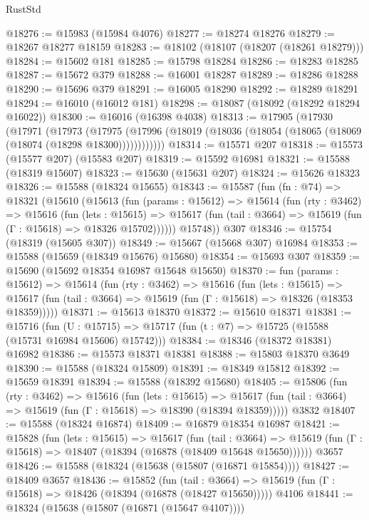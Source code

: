 \begin{lexlean}{RustStd}
\begin{coremodule}
@18276 := @15983 (@15984 @4076)
@18277 := @18274 @18276
@18279 := @18267 @18277 @18159
@18283 := @18102 (@18107 (@18207 (@18261 @18279)))
@18284 := @15602 @181
@18285 := @15798 @18284
@18286 := @18283 @18285
@18287 := @15672 @379
@18288 := @16001 @18287
@18289 := @18286 @18288
@18290 := @15696 @379
@18291 := @16005 @18290
@18292 := @18289 @18291
@18294 := @16010 (@16012 @181)
@18298 := @18087 (@18092 (@18292 @18294 @16022))
@18300 := @16016 (@16398 @4038)
@18313 := @17905
    (@17930
      (@17971
        (@17973
          (@17975 (@17996 (@18019 (@18036 (@18054 (@18065 (@18069 (@18074 (@18298 @18300))))))))))))
@18314 := @15571 @207
@18318 := @15573 (@15577 @207) (@15583 @207)
@18319 := @15592 @16981
@18321 := @15588 (@18319 @15607)
@18323 := @15630 (@15631 @207)
@18324 := @15626 @18323
@18326 := @15588 (@18324 @15655)
@18343 := @15587
    (fun (fn : @74) =>
    @18321
      (@15610
        (@15613
          (fun (params : @15612) =>
          @15614
            (fun (rty : @3462) =>
            @15616
              (fun (lets : @15615) =>
              @15617 (fun (tail : @3664) => @15619 (fun (Γ : @15618) => @18326 @15702))))))
        @15748))
    @307
@18346 := @15754 (@18319 (@15605 @307))
@18349 := @15667 (@15668 @307) @16984
@18353 := @15588 (@15659 (@18349 @15676) @15680)
@18354 := @15693 @307
@18359 := @15690 (@15692 @18354 @16987 @15648 @15650)
@18370 := fun (params : @15612) =>
  @15614
    (fun (rty : @3462) =>
    @15616
      (fun (lets : @15615) =>
      @15617 (fun (tail : @3664) => @15619 (fun (Γ : @15618) => @18326 (@18353 @18359)))))
@18371 := @15613 @18370
@18372 := @15610 @18371
@18381 := @15716
    (fun (U : @15715) => @15717 (fun (t : @7) => @15725 (@15588 (@15731 @16984 @15606) @15742)))
@18384 := @18346 (@18372 @18381) @16982
@18386 := @15573 @18371 @18381
@18388 := @15803 @18370 @3649
@18390 := @15588 (@18324 @15809)
@18391 := @18349 @15812
@18392 := @15659 @18391
@18394 := @15588 (@18392 @15680)
@18405 := @15806
    (fun (rty : @3462) =>
    @15616
      (fun (lets : @15615) =>
      @15617 (fun (tail : @3664) => @15619 (fun (Γ : @15618) => @18390 (@18394 @18359)))))
    @3832
@18407 := @15588 (@18324 @16874)
@18409 := @16879 @18354 @16987
@18421 := @15828
    (fun (lets : @15615) =>
    @15617
      (fun (tail : @3664) =>
      @15619 (fun (Γ : @15618) => @18407 (@18394 (@16878 (@18409 @15648 @15650))))))
    @3657
@18426 := @15588 (@18324 (@15638 (@15807 (@16871 @15854))))
@18427 := @18409 @3657
@18436 := @15852
    (fun (tail : @3664) => @15619 (fun (Γ : @15618) => @18426 (@18394 (@16878 (@18427 @15650)))))
    @4106
@18441 := @18324 (@15638 (@15807 (@16871 (@15647 @4107))))

\end{coremodule}
\end{lexlean}
